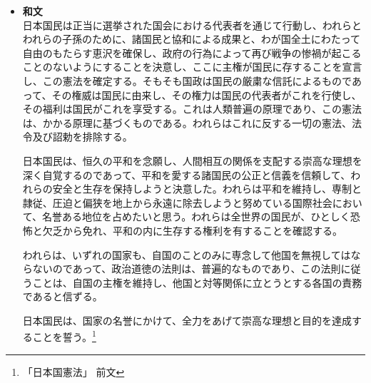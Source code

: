 \documentclass[a4paper,10pt]{ltjsarticle}
\begin{document}
\begin{itemize} 
  \item[]
\textbf{和文}\\
\hspace{3mm} 日本国民は正当に選挙された国会における代表者を通じて行動し、われらとわれらの子孫のために、諸国民と協和による成果と、わが国全土にわたって自由のもたらす恵沢を確保し、政府の行為によって再び戦争の惨禍が起こることのないようにすることを決意し、ここに主権が国民に存することを宣言し、この憲法を確定する。そもそも国政は国民の厳粛な信託によるものであって、その権威は国民に由来し、その権力は国民の代表者がこれを行使し、その福利は国民がこれを享受する。これは人類普遍の原理であり、この憲法は、かかる原理に基づくものである。われらはこれに反する一切の憲法、法令及び詔勅を排除する。\par

\hspace{3mm} 日本国民は、恒久の平和を念願し、人間相互の関係を支配する崇高な理想を深く自覚するのであって、平和を愛する諸国民の公正と信義を信頼して、われらの安全と生存を保持しようと決意した。われらは平和を維持し、専制と隷従、圧迫と偏狭を地上から永遠に除去しようと努めている国際社会において、名誉ある地位を占めたいと思う。われらは全世界の国民が、ひとしく恐怖と欠乏から免れ、平和の内に生存する権利を有することを確認する。\par

\hspace{3mm} われらは、いずれの国家も、自国のことのみに専念して他国を無視してはならないのであって、政治道徳の法則は、普遍的なものであり、この法則に従うことは、自国の主権を維持し、他国と対等関係に立とうとする各国の責務であると信ずる。\par

日本国民は、国家の名誉にかけて、全力をあげて崇高な理想と目的を達成することを誓う。\footnote{「日本国憲法」 前文}
 \par 

\newpage


\end{itemize}
\end{document}
